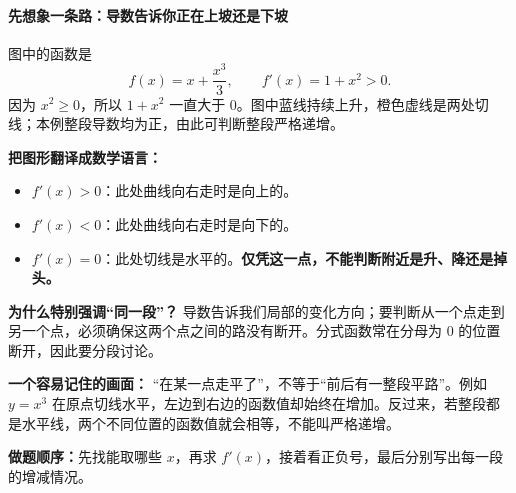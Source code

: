 \clearpage
\begin{explanationbox}
\begin{minipage}{\linewidth}
\paragraph{先想象一条路：导数告诉你正在上坡还是下坡}

\end{minipage}

图中的函数是
\[
f(x)=x+\frac{x^3}{3},\qquad f'(x)=1+x^2>0.
\]
因为 $x^2\ge0$，所以 $1+x^2$ 一直大于 $0$。图中蓝线持续上升，橙色虚线是两处切线；本例整段导数均为正，由此可判断整段严格递增。

\textbf{把图形翻译成数学语言：}
\begin{itemize}
  \item $f'(x)>0$：此处曲线向右走时是向上的。
  \item $f'(x)<0$：此处曲线向右走时是向下的。
  \item $f'(x)=0$：此处切线是水平的。\textbf{仅凭这一点，不能判断附近是升、降还是掉头。}
\end{itemize}

\textbf{为什么特别强调``同一段''？}
导数告诉我们局部的变化方向；要判断从一个点走到另一个点，必须确保这两个点之间的路没有断开。分式函数常在分母为 $0$ 的位置断开，因此要分段讨论。

\textbf{一个容易记住的画面：}
``在某一点走平了''，不等于``前后有一整段平路''。例如 $y=x^3$ 在原点切线水平，左边到右边的函数值却始终在增加。反过来，若整段都是水平线，两个不同位置的函数值就会相等，不能叫严格递增。

\textbf{做题顺序：}先找能取哪些 $x$，再求 $f'(x)$，接着看正负号，最后分别写出每一段的增减情况。
\end{explanationbox}
